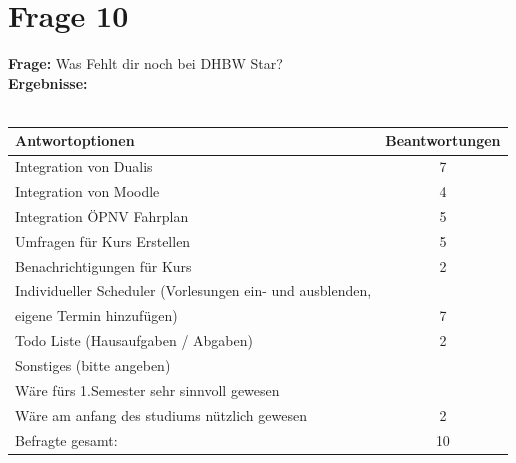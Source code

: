 \section{Frage 10}

\textbf{Frage:} Was Fehlt dir noch bei DHBW Star?\\
\textbf{Ergebnisse:}\\
\\
\begin{tabular}{|l|c|}\hline
	\textbf{Antwortoptionen} & \textbf{Beantwortungen} \\\hline
	Integration von Dualis  	& 7 \\\hline
	Integration von Moodle 	& 4 \\\hline
	Integration ÖPNV Fahrplan  			& 5 \\\hline
	Umfragen für Kurs Erstellen & 5 \\\hline
	Benachrichtigungen für Kurs  & 2 \\\hline
	Individueller Scheduler (Vorlesungen ein- und ausblenden,\\ eigene Termin hinzufügen) & 7 \\\hline
	Todo Liste (Hausaufgaben / Abgaben) & 2 \\\hline
	Sonstiges (bitte angeben)\\
	Wäre fürs 1.Semester sehr sinnvoll gewesen\\
	Wäre am anfang des studiums nützlich gewesen & 2 \\\hline 
	Befragte gesamt:			& 10 \\\hline			
\end{tabular}

\begin{figure}[htbp]
\end{figure}